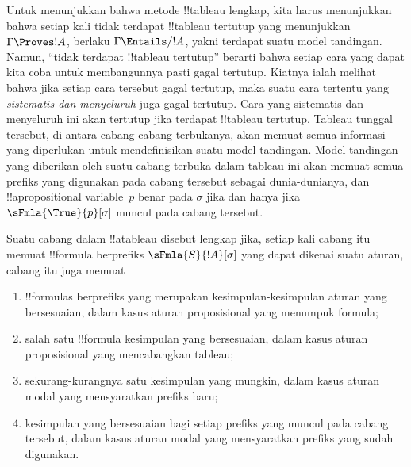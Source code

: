 \documentclass[../../../include/open-logic-section]{subfiles}
\begin{document}


\begin{explain}
  Untuk menunjukkan bahwa metode !!{tableau} lengkap, kita harus
  menunjukkan bahwa setiap kali tidak terdapat !!{tableau} tertutup yang
  menunjukkan $\Gamma \Proves !A$, berlaku $\Gamma \Entails/ !A$, yakni
  terdapat suatu model tandingan. Namun, ``tidak terdapat !!{tableau}
  tertutup'' berarti bahwa setiap cara yang dapat kita coba untuk
  membangunnya pasti gagal tertutup. Kiatnya ialah melihat bahwa jika setiap
  cara tersebut gagal tertutup, maka suatu cara tertentu yang
  \emph{sistematis dan menyeluruh} juga gagal tertutup. Cara yang sistematis
  dan menyeluruh ini akan tertutup jika terdapat !!{tableau} tertutup.
  Tableau tunggal tersebut, di antara cabang-cabang terbukanya, akan memuat
  semua informasi yang diperlukan untuk mendefinisikan suatu model tandingan.
  Model tandingan yang diberikan oleh suatu cabang terbuka dalam tableau ini
  akan memuat semua prefiks yang digunakan pada cabang tersebut sebagai
  dunia-dunianya, dan !!a{propositional variable}~$p$ benar pada $\sigma$
  jika dan hanya jika $\sFmla{\True}{p}[\sigma]$ muncul pada cabang tersebut.
\end{explain}

\begin{defn}
  Suatu cabang dalam !!a{tableau} disebut lengkap jika, setiap kali cabang
  itu memuat !!{formula} berprefiks $\sFmla{S}{!A}[\sigma]$ yang dapat
  dikenai suatu aturan, cabang itu juga memuat
  \begin{enumerate}
    \item !!{formula}s berprefiks yang merupakan kesimpulan-kesimpulan
      aturan yang bersesuaian, dalam kasus aturan proposisional yang
      menumpuk formula;
    \item salah satu !!{formula} kesimpulan yang bersesuaian, dalam kasus
      aturan proposisional yang mencabangkan tableau;
    \item sekurang-kurangnya satu kesimpulan yang mungkin, dalam kasus aturan
      modal yang mensyaratkan prefiks baru;
    \item kesimpulan yang bersesuaian bagi setiap prefiks yang muncul pada
      cabang tersebut, dalam kasus aturan modal yang mensyaratkan prefiks
      yang sudah digunakan.
  \end{enumerate}
\end{defn}
\end{document}
